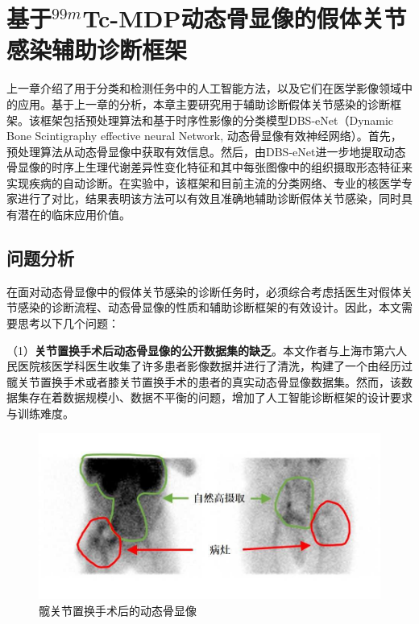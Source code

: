 \chapter{基于\texorpdfstring{\(^{99m}\)}{99m}Tc-MDP动态骨显像的假体关节感染辅助诊断框架}

上一章介绍了用于分类和检测任务中的人工智能方法，以及它们在医学影像领域中的应用。基于上一章的分析，本章主要研究用于辅助诊断假体关节感染的诊断框架。该框架包括预处理算法和基于时序性影像的分类模型DBS-eNet（Dynamic Bone Scintigraphy effective neural Network, 动态骨显像有效神经网络）\cite{nie2023artificial}。首先，预处理算法从动态骨显像中获取有效信息。然后，由DBS-eNet进一步地提取动态骨显像的时序上生理代谢差异性变化特征和其中每张图像中的组织摄取形态特征来实现疾病的自动诊断。在实验中，该框架和目前主流的分类网络、专业的核医学专家进行了对比，结果表明该方法可以有效且准确地辅助诊断假体关节感染，同时具有潜在的临床应用价值。

\section{问题分析}

在面对动态骨显像中的假体关节感染的诊断任务时，必须综合考虑括医生对假体关节感染的诊断流程、动态骨显像的性质和辅助诊断框架的有效设计。因此，本文需要思考以下几个问题：

（1）\textbf{关节置换手术后动态骨显像的公开数据集的缺乏}。本文作者与上海市第六人民医院核医学科医生收集了许多患者影像数据并进行了清洗，构建了一个由经历过髋关节置换手术或者膝关节置换手术的患者的真实动态骨显像数据集。然而，该数据集存在着数据规模小、数据不平衡的问题，增加了人工智能诊断框架的设计要求与训练难度。

\begin{figure}[h]
  \centering
  \includegraphics{figures/chap03_hip.jpg}
  \caption{髋关节置换手术后的动态骨显像}
  \label{fig:chap03_hip}
\end{figure}

